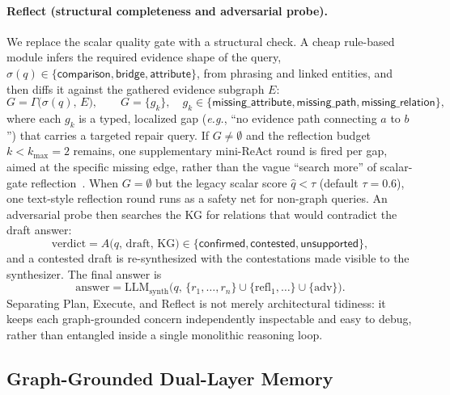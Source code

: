 \documentclass[11pt,a4paper]{article}
\newcommand{\eg}{\textit{e.g.}}
\begin{document}
\paragraph{Reflect (structural completeness and adversarial probe).}
We replace the scalar quality gate with a structural check.
A cheap rule-based module infers the required evidence shape of the query, $\sigma(q)\in\{\textsf{comparison},\textsf{bridge},\textsf{attribute}\}$, from phrasing and linked entities, and then diffs it against the gathered evidence subgraph $E$:
\begin{equation}
G=\Gamma\bigl(\sigma(q),\,E\bigr),\qquad G=\{g_k\},\quad g_k\in\{\textsf{missing\_attribute},\textsf{missing\_path},\textsf{missing\_relation}\},
\label{eq:reflect}
\end{equation}
where each $g_k$ is a typed, localized gap (\eg, ``no evidence path connecting $a$ to $b$'') that carries a targeted repair query.
If $G\neq\emptyset$ and the reflection budget $k<k_{\max}{=}2$ remains, one supplementary mini-ReAct round is fired per gap, aimed at the specific missing edge, rather than the vague ``search more'' of scalar-gate reflection~\citep{shinn2023reflexion}.
When $G=\emptyset$ but the legacy scalar score $\hat q<\tau$ (default $\tau{=}0.6$), one text-style reflection round runs as a safety net for non-graph queries.
An adversarial probe then searches the KG for relations that would contradict the draft answer:
\begin{equation}
\mathrm{verdict}=A\bigl(q,\,\mathrm{draft},\,\mathrm{KG}\bigr)\in\{\textsf{confirmed},\textsf{contested},\textsf{unsupported}\},
\label{eq:adversarial}
\end{equation}
and a contested draft is re-synthesized with the contestations made visible to the synthesizer.
The final answer is
\begin{equation}
\mathrm{answer}=\mathrm{LLM}_{\mathrm{synth}}\!\bigl(q,\,\{r_{1},\dots,r_{n}\}\cup\{\mathrm{refl}_{1},\dots\}\cup\{\mathrm{adv}\}\bigr).
\label{eq:synth}
\end{equation}
Separating Plan, Execute, and Reflect is not merely architectural tidiness: it keeps each graph-grounded concern independently inspectable and easy to debug, rather than entangled inside a single monolithic reasoning loop.

\subsection{Graph-Grounded Dual-Layer Memory}
\label{sec:memory}
\end{document}
